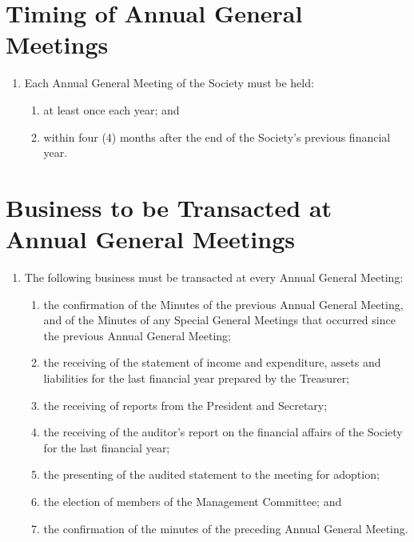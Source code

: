 \documentclass[a4paper]{article}
\begin{document}
\section{Timing of Annual General Meetings}
\begin{enumerate}
\item Each Annual General Meeting of the Society must be held:
	\begin{enumerate}
	\item at least once each year; and
	\item within four (4) months after the end of the Society's previous financial year.
	\end{enumerate}
\end{enumerate}

\section{Business to be Transacted at Annual General Meetings}
\begin{enumerate}
\item The following business must be transacted at every Annual General Meeting:
	\begin{enumerate}
	\item the confirmation of the Minutes of the previous Annual General Meeting, and of the Minutes of any Special General Meetings that occurred since the previous Annual General Meeting;
	\item the receiving of the statement of income and expenditure, assets and liabilities for the last financial year prepared by the Treasurer;
	\item the receiving of reports from the President and Secretary;
	\item the receiving of the auditor's report on the financial affairs of the Society for the last financial year;
	\item the presenting of the audited statement to the meeting for adoption;
	\item the election of members of the Management Committee; and
	\item the confirmation of the minutes of the preceding Annual General Meeting.
	\end{enumerate}
\end{enumerate}
\end{document}
